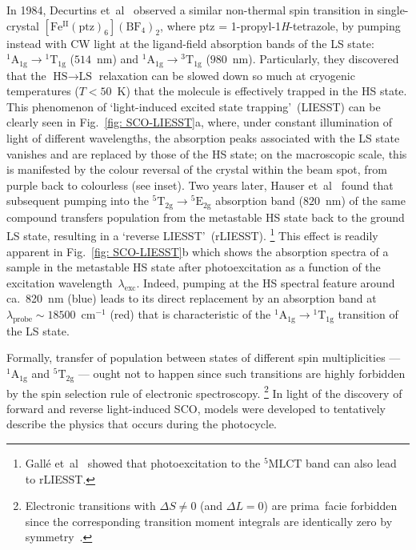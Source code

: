 In 1984, Decurtins et~al~\cite{Decurtins1984, Decurtins1985}
observed a similar non-thermal spin transition in single-crystal
$\mathrm{[Fe^{II}(ptz)_6](BF_4)_2}$, where ptz = 1-propyl-1\textit{H}-tetrazole,
by pumping instead with CW light at the ligand-field absorption bands of the LS state:
$\mathrm{^1A_{1g}} \rightarrow \mathrm{^1T_{1g}}$ ($514$~nm) and
$\mathrm{^1A_{1g}} \rightarrow \mathrm{^3T_{1g}}$ ($980$~nm).
%
Particularly, they discovered that the $\text{HS} \rightarrow \text{LS}$ relaxation
can be slowed down so much at cryogenic temperatures ($T < 50$~K)
that the molecule is effectively trapped in the HS state.
%
This phenomenon of `light-induced excited state trapping'~(LIESST)
can be clearly seen in Fig.~\ref{fig: SCO-LIESST}a,
where, under constant illumination of light of different wavelengths,
the absorption peaks associated with the LS state vanishes
and are replaced by those of the HS state;
on the macroscopic scale, this is manifested by the colour reversal
of the crystal within the beam spot, from purple back to colourless (see inset).
%
Two years later, Hauser et~al~\cite{Hauser1986a, Hauser1986b} found that
subsequent pumping into the $\mathrm{^5T_{2g}} \rightarrow \mathrm{^5E_{2g}}$
absorption band ($820$~nm) of the same compound
transfers population from the metastable HS state back to the ground LS state,
resulting in a `reverse LIESST'~(rLIESST).%
\footnote{Gall\'{e} et~al~\cite{Galle2013} showed that
photoexcitation to the $\mathrm{^5MLCT}$ band can also lead to rLIESST.}
%
This effect is readily apparent in Fig.~\ref{fig: SCO-LIESST}b
which shows the absorption spectra of a sample in the metastable HS state
after photoexcitation as a function of the excitation wavelength~$\lambda_\text{exc}$.
Indeed, pumping at the HS spectral feature around ca.~820~nm (blue) leads
to its direct replacement by an absorption band at $\lambda_\text{probe} \sim 18500$~cm$^{-1}$ (red)
that is characteristic of the $\mathrm{^1A_{1g}} \rightarrow \mathrm{^1T_{1g}}$
transition of the LS state.

Formally, transfer of population between states of different spin multiplicities ---
$\mathrm{^1A_{1g}}$ and $\mathrm{^5T_{2g}}$ --- ought not to happen
since such transitions are highly forbidden by the spin selection rule of electronic spectroscopy.%
\footnote{Electronic transitions with $\Delta S \neq 0$ (and $\Delta L = 0$) are prima~facie forbidden
since the corresponding transition moment integrals are identically zero by symmetry~\cite{Harris1978}.}
%
In light of the discovery of forward and reverse light-induced SCO,
models were developed to tentatively describe the physics that occurs during the photocycle.

